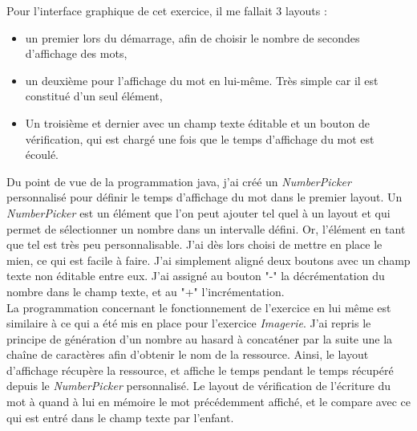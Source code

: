 Pour l'interface graphique de cet exercice, il me fallait 3 layouts :
\begin{itemize}
\item un premier lors du démarrage, afin de choisir le nombre de secondes d'affichage des mots,
\item un deuxième pour l'affichage du mot en lui-même. Très simple car il est constitué d'un seul élément,
\item Un troisième et dernier avec un champ texte éditable et un bouton de vérification, qui est chargé une fois que le temps d'affichage du mot est écoulé.\\
\end{itemize}

Du point de vue de la programmation java, j'ai créé un \textit{NumberPicker} personnalisé pour définir le temps d'affichage du mot dans le premier layout. Un \textit{NumberPicker} est un élément que l'on peut ajouter tel quel à un layout et qui permet de sélectionner un nombre dans un intervalle défini. Or, l'élément en tant que tel est très peu personnalisable. J'ai dès lors choisi de mettre en place le mien, ce qui est facile à faire. J'ai simplement aligné deux boutons avec un champ texte non éditable entre eux. J'ai assigné au bouton "-" la décrémentation du nombre dans le champ texte, et au "+" l'incrémentation.\\

La programmation concernant le fonctionnement de l'exercice en lui même est similaire à ce qui a été mis en place pour l'exercice \textit{Imagerie}. J'ai repris le principe de génération d'un nombre au hasard à concaténer par la suite une la chaîne de caractères afin d'obtenir le nom de la ressource. Ainsi, le layout d'affichage récupère la ressource, et affiche le temps pendant le temps récupéré depuis le \textit{NumberPicker} personnalisé. Le layout de vérification de l'écriture du mot à quand à lui en mémoire le mot précédemment affiché, et le compare avec ce qui est entré dans le champ texte par l'enfant.\\


